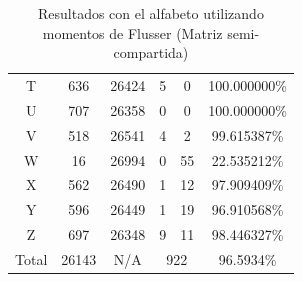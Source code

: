 \documentclass[a4paper, 11pt, oneside]{report}
\begin{document}
\begin{table}
\begin{tabular}{|c|c|c|c|c|c|}
	T & 636 & 26424 & 5 & 0 & 100.000000\% \\ 
	U & 707 & 26358 & 0 & 0 & 100.000000\% \\ 
	V & 518 & 26541 & 4 & 2 & 99.615387\% \\ 
	W & 16 & 26994 & 0 & 55 & 22.535212\% \\ 
	X & 562 & 26490 & 1 & 12 & 97.909409\% \\ 
	Y & 596 & 26449 & 1 & 19 & 96.910568\% \\ 
	Z & 697 & 26348 & 9 & 11 & 98.446327\% \\ 
	\hline
	Total & 26143 & N/A & \multicolumn{2}{|c|}{922} & 96.5934\% \\
	\hline
\end{tabular}
\caption{Resultados con el alfabeto utilizando momentos de Flusser (Matriz semi-compartida)}
\label{tb:alphaFlShared}
\end{table}
\end{document}
